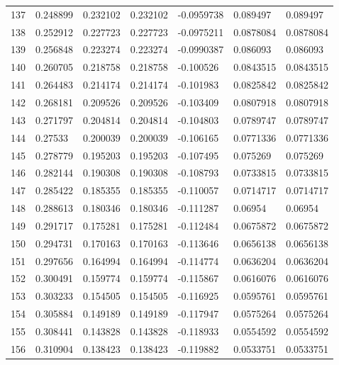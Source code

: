 \begin{longtable}{l|lll|lll}
 137 &  0.248899    & 0.232102    & 0.232102    & -0.0959738   & 0.089497    & 0.089497    \\
 138 &  0.252912    & 0.227723    & 0.227723    & -0.0975211   & 0.0878084   & 0.0878084   \\
 139 &  0.256848    & 0.223274    & 0.223274    & -0.0990387   & 0.086093    & 0.086093    \\
 140 &  0.260705    & 0.218758    & 0.218758    & -0.100526    & 0.0843515   & 0.0843515   \\
 141 &  0.264483    & 0.214174    & 0.214174    & -0.101983    & 0.0825842   & 0.0825842   \\
 142 &  0.268181    & 0.209526    & 0.209526    & -0.103409    & 0.0807918   & 0.0807918   \\
 143 &  0.271797    & 0.204814    & 0.204814    & -0.104803    & 0.0789747   & 0.0789747   \\
 144 &  0.27533     & 0.200039    & 0.200039    & -0.106165    & 0.0771336   & 0.0771336   \\
 145 &  0.278779    & 0.195203    & 0.195203    & -0.107495    & 0.075269    & 0.075269    \\
 146 &  0.282144    & 0.190308    & 0.190308    & -0.108793    & 0.0733815   & 0.0733815   \\
 147 &  0.285422    & 0.185355    & 0.185355    & -0.110057    & 0.0714717   & 0.0714717   \\
 148 &  0.288613    & 0.180346    & 0.180346    & -0.111287    & 0.06954     & 0.06954     \\
 149 &  0.291717    & 0.175281    & 0.175281    & -0.112484    & 0.0675872   & 0.0675872   \\
 150 &  0.294731    & 0.170163    & 0.170163    & -0.113646    & 0.0656138   & 0.0656138   \\
 151 &  0.297656    & 0.164994    & 0.164994    & -0.114774    & 0.0636204   & 0.0636204   \\
 152 &  0.300491    & 0.159774    & 0.159774    & -0.115867    & 0.0616076   & 0.0616076   \\
 153 &  0.303233    & 0.154505    & 0.154505    & -0.116925    & 0.0595761   & 0.0595761   \\
 154 &  0.305884    & 0.149189    & 0.149189    & -0.117947    & 0.0575264   & 0.0575264   \\
 155 &  0.308441    & 0.143828    & 0.143828    & -0.118933    & 0.0554592   & 0.0554592   \\
 156 &  0.310904    & 0.138423    & 0.138423    & -0.119882    & 0.0533751   & 0.0533751   \\

\end{longtable}

